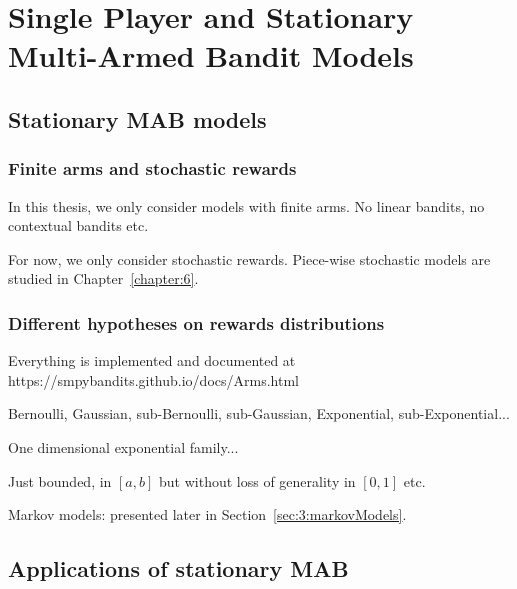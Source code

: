 
\chapter{Single Player and Stationary Multi-Armed Bandit Models}
\label{chapter:2}
\minitoc
\newpage
\graphicspath{{2-Chapters/2-Chapter/Images/}}

\section{Stationary MAB models}
\label{sec:2:notations}

\subsection{Finite arms and stochastic rewards}

In this thesis, we only consider models with finite arms.
No linear bandits, no contextual bandits etc.

For now, we only consider stochastic rewards. Piece-wise stochastic models are studied in Chapter~\ref{chapter:6}.


\subsection{Different hypotheses on rewards distributions}

Everything is implemented and documented at
https://smpybandits.github.io/docs/Arms.html

Bernoulli, Gaussian, sub-Bernoulli, sub-Gaussian, Exponential, sub-Exponential...

One dimensional exponential family...

Just bounded, in $[a,b]$ but without loss of generality in $[0,1]$ etc.

Markov models: presented later in Section~\ref{sec:3:markovModels}.


\section{Applications of stationary MAB}
\label{sec:2:applicationsofStationaryMAB}


